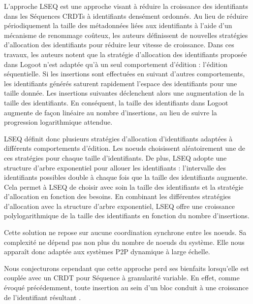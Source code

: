L'approche LSEQ \cite{lseq2013, lseq2017} est une approche visant à réduire la croissance des identifiants dans les Séquences \acp{CRDT} à identifiants densément ordonnés.
Au lieu de réduire périodiquement la taille des métadonnées liées aux identifiants à l'aide d'un mécanisme de renommage coûteux, les auteurs définissent de nouvelles stratégies d'allocation des identifiants pour réduire leur vitesse de croissance.
Dans ces travaux, les auteurs notent que la stratégie d'allocation des identifiants proposée dans Logoot \cite{2009-logoot-weiss} n'est adaptée qu'à un seul comportement d'édition : l'édition séquentielle.
Si les insertions sont effectuées en suivant d'autres comportements, les identifiants générés saturent rapidement l'espace des identifiants pour une taille donnée.
Les insertions suivantes déclenchent alors une augmentation de la taille des identifiants.
En conséquent, la taille des identifiants dans Logoot augmente de façon linéaire au nombre d'insertions, au lieu de suivre la progression logarithmique attendue.

LSEQ définit donc plusieurs stratégies d'allocation d'identifiants adaptées à différents comportements d'édition.
Les noeuds choisissent aléatoirement une de ces stratégies pour chaque taille d'identifiants.
De plus, LSEQ adopte une structure d'arbre exponentiel pour allouer les identifiants : l'intervalle des identifiants possibles double à chaque fois que la taille des identifiants augmente.
Cela permet à LSEQ de choisir avec soin la taille des identifiants et la stratégie d'allocation en fonction des besoins.
En combinant les différentes stratégies d'allocation avec la structure d'arbre exponentiel, LSEQ offre une croissance polylogarithmique de la taille des identifiants en fonction du nombre d'insertions.

Cette solution ne repose sur aucune coordination synchrone entre les noeuds.
Sa complexité ne dépend pas non plus du nombre de noeuds du système.
Elle nous apparaît donc adaptée aux systèmes \ac{P2P} dynamique à large échelle.

Nous conjecturons cependant que cette approche perd ses bienfaits lorsqu'elle est couplée avec un \ac{CRDT} pour Séquence à granularité variable.
En effet, comme évoqué précédemment, toute insertion au sein d'un bloc conduit à une croissance de l'identifiant résultant .
